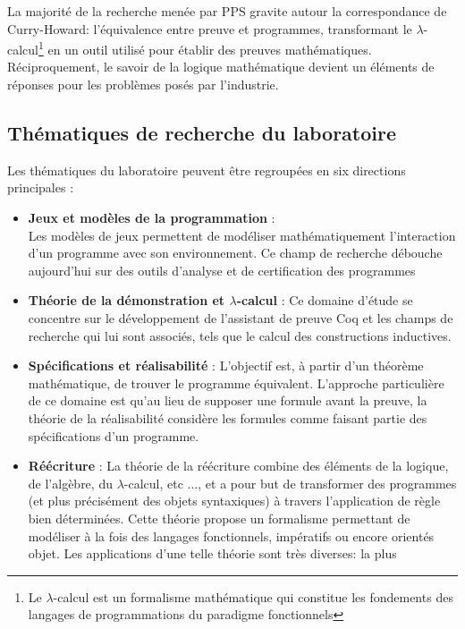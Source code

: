 \documentclass[a4paper, 11pt]{report}
\newcommand{\lc}[0]{$\lambda$-calcul\xspace}
\begin{document}
    La majorité de la recherche menée par PPS gravite autour la correspondance
    de Curry-Howard: l'équivalence entre preuve et programmes, transformant
    le \lc\footnote{Le \lc{} est un formalisme mathématique
    qui constitue les fondements des langages de programmations du paradigme fonctionnels} en un
    outil utilisé pour établir des preuves mathématiques. Réciproquement, le
    savoir de la logique mathématique devient un éléments de réponses pour les
    problèmes posés par l'industrie.

    \subsection{Thématiques de recherche du laboratoire}
      Les thématiques du laboratoire peuvent être regroupées en six directions
      principales :
      \begin{itemize}
        \item \textbf{Jeux et modèles de la programmation} : \\
          Les modèles de jeux permettent de modéliser mathématiquement
          l'interaction d'un programme avec son environnement. Ce champ de
          recherche débouche aujourd'hui sur des outils d'analyse et de
          certification des programmes
        \item \textbf{Théorie de la démonstration et \lc} :
          Ce domaine d'étude se concentre sur le développement de l'assistant
          de preuve Coq et les champs de recherche qui lui sont associés,
          tels que le calcul des constructions inductives.
        \item \textbf{Spécifications et réalisabilité} :
          L'objectif est, à partir d'un théorème mathématique, de trouver
          le programme équivalent. L'approche particulière de ce domaine est
          qu'au lieu de supposer une formule avant la preuve, la théorie de la
          réalisabilité considère les formules comme faisant partie des
          spécifications d'un programme.
        \item \textbf{Réécriture} :
          La théorie de la réécriture combine des éléments de la logique, de
          l'algèbre, du \lc, etc $\ldots$, et a pour but de transformer des
          programmes (et plus précisément des objets syntaxiques) à travers
          l'application de règle bien déterminées. Cette théorie propose
          un formalisme permettant de modéliser à la fois des langages
          fonctionnels, impératifs ou encore orientés objet.
          Les applications d'une telle théorie sont très diverses: la plus

\end{itemize}
\end{document}
